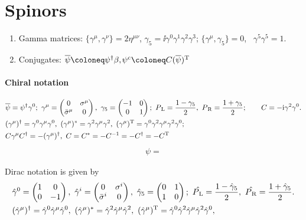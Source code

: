 \documentclass[CheatSheet]{subfiles}
\begin{document}
\summarystyle
\section{Spinors}
\begin{enumerate}[label={}]
  \item Gamma matrices: \quad
$\{\gamma^\mu,\gamma^\nu\}=2\eta^{\mu\nu}$,\quad
$\gamma_5=\ii\gamma^0\gamma^1\gamma^2\gamma^3$;\quad
$\{\gamma^\mu,\gamma_5\}=0$,~
$\gamma^5\gamma^5=1$.
 \item Conjugates: $\overline{\psi} \deq \psi^\dagger \beta,$\qquad $\psi^\cc\deq C(\overline\psi)^\TT$
\end{enumerate}

\paragraph{Chiral notation}
\begin{align}\label{eq:chiralnotation}
& \overline{\psi}=\psi^\dagger\gamma^0;~
 \gamma^\mu=\begin{pmatrix}0&\sigma^\mu\\\bar\sigma^\mu&0\end{pmatrix},~
 \gamma_5=\begin{pmatrix}-1&0\\0&1\end{pmatrix};~
 P_{\,\mathrm L} = \frac{1-\gamma_5}{2},~
 P_{\,\mathrm R} = \frac{1+\gamma_5}{2};\qquad C=-{\mathrm{i}}\gamma^2\gamma^0.
\\&
(\gamma^\mu)^\dagger = \gamma^0\gamma^\mu\gamma^0,~
(\gamma^\mu)^*       = \gamma^2\gamma^\mu\gamma^2,~
(\gamma^\mu)^{\mathrm{T}}     = \gamma^0\gamma^2\gamma^\mu\gamma^2\gamma^0;
\\&
C\gamma^\mu C^\dagger = -(\gamma^\mu)^\dagger,~
C=C^*=-C^{-1}=-C^\dagger=-C^{\mathrm{T}}
\end{align}
\begin{align}
  \psi=
\end{align}

\begin{RemarkBox}Dirac notation is given by
\begin{align}\label{eq:diracnotation}
& %
 \hat\gamma^0=\pmat{1&0\\0&-1},~
 \hat\gamma^i=\pmat{0&\sigma^i\\\bar\sigma^i&0},~
 \hat\gamma_5=\pmat{0&1\\1&0};~
 \hat\PL = \frac{1-\hat\gamma_5}{2},~
 \hat\PR = \frac{1+\hat\gamma_5}{2}.
\\&
(\hat\gamma^\mu)^\dagger = \hat\gamma^0\hat\gamma^\mu\hat\gamma^0,~
(\hat\gamma^\mu)^*       = \hat\gamma^2\hat\gamma^\mu\hat\gamma^2,~
(\hat\gamma^\mu)^\TT     = \hat\gamma^0\hat\gamma^2\hat\gamma^\mu\hat\gamma^2\hat\gamma^0,
\end{align}
\end{RemarkBox}
\end{document}
